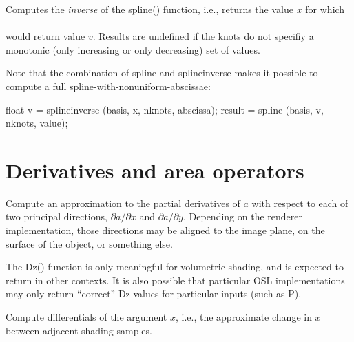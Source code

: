 \documentclass[11pt,letterpaper]{book}
\def\P{{\cf P}\xspace}
\begin{document}
Computes the \emph{inverse} of the {\cf spline()} function, i.e., returns
the value $x$ for which \\
   \\ 
would return value
$v$.  Results are undefined if the knots do not specifiy a monotonic
(only increasing or only decreasing) set of values.

Note that the combination of {\cf spline} and {\cf splineinverse} makes
it possible to compute a full spline-with-nonuniform-abscissae:
\begin{smallcode}
    float v = splineinverse (basis, x, nknots, abscissa);
    result = spline (basis, v, nknots, value);
\end{smallcode}
\apiend


\newpage
\section{Derivatives and area operators}
\label{sec:stdlib:derivs}

 
Compute an approximation to the partial derivatives of $a$ with respect to
each of two principal directions, $\partial a / \partial x$ and
$\partial a / \partial y$.  Depending on the renderer
implementation, those directions may be aligned to the image plane,
on the surface of the object, or something else.

The {\cf Dz()} function is only meaningful for volumetric shading, and
is expected to return {} in other contexts.  It is also possible
that particular OSL implementations may only return ``correct'' {\cf Dz}
values for particular inputs (such as \P).
\apiend

Compute differentials of the argument $x$, i.e., the approximate change
in $x$ between adjacent shading samples.
\apiend
\end{document}
